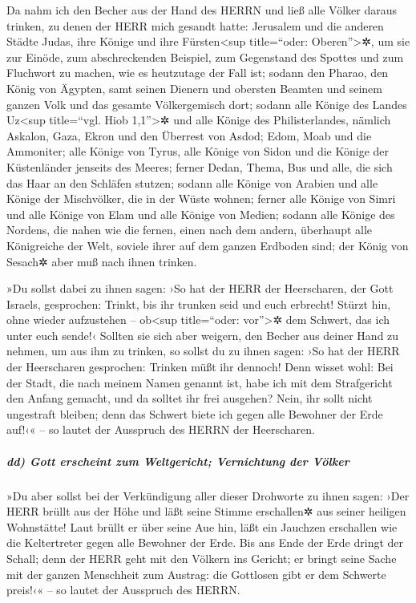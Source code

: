 Da nahm ich den Becher aus der Hand des HERRN und ließ
alle Völker daraus trinken, zu denen der HERR mich gesandt hatte:
Jerusalem und die anderen Städte Judas, ihre Könige und
ihre Fürsten\textless sup title=``oder: Oberen''\textgreater✲, um sie
zur Einöde, zum abschreckenden Beispiel, zum Gegenstand des Spottes und
zum Fluchwort zu machen, wie es heutzutage der Fall ist;
sodann den Pharao, den König von Ägypten, samt seinen
Dienern und obersten Beamten und seinem ganzen Volk und
das gesamte Völkergemisch dort; sodann alle Könige des Landes
Uz\textless sup title=``vgl. Hiob 1,1''\textgreater✲ und alle Könige des
Philisterlandes, nämlich Askalon, Gaza, Ekron und den Überrest von
Asdod; Edom, Moab und die Ammoniter; alle
Könige von Tyrus, alle Könige von Sidon und die Könige der Küstenländer
jenseits des Meeres; ferner Dedan, Thema, Bus und alle,
die sich das Haar an den Schläfen stutzen; sodann alle
Könige von Arabien und alle Könige der Mischvölker, die in der Wüste
wohnen; ferner alle Könige von Simri und alle Könige von
Elam und alle Könige von Medien; sodann alle Könige des
Nordens, die nahen wie die fernen, einen nach dem andern, überhaupt alle
Königreiche der Welt, soviele ihrer auf dem ganzen Erdboden sind; der
König von Sesach✲ aber muß nach ihnen trinken.

»Du sollst dabei zu ihnen sagen: ›So hat der HERR der
Heerscharen, der Gott Israels, gesprochen: Trinkt, bis ihr trunken seid
und euch erbrecht! Stürzt hin, ohne wieder aufzustehen --
ob\textless sup title=``oder: vor''\textgreater✲ dem Schwert, das ich
unter euch sende!‹ Sollten sie sich aber weigern, den
Becher aus deiner Hand zu nehmen, um aus ihm zu trinken, so sollst du zu
ihnen sagen: ›So hat der HERR der Heerscharen gesprochen: Trinken müßt
ihr dennoch! Denn wisset wohl: Bei der Stadt, die nach
meinem Namen genannt ist, habe ich mit dem Strafgericht den Anfang
gemacht, und da solltet ihr frei ausgehen? Nein, ihr sollt nicht
ungestraft bleiben; denn das Schwert biete ich gegen alle Bewohner der
Erde auf!‹« -- so lautet der Ausspruch des HERRN der Heerscharen.

\hypertarget{dd-gott-erscheint-zum-weltgericht-vernichtung-der-vuxf6lker}{%
\subparagraph{dd) Gott erscheint zum Weltgericht; Vernichtung der
Völker}\label{dd-gott-erscheint-zum-weltgericht-vernichtung-der-vuxf6lker}}

»Du aber sollst bei der Verkündigung aller dieser
Drohworte zu ihnen sagen: ›Der HERR brüllt aus der Höhe und läßt seine
Stimme erschallen✲ aus seiner heiligen Wohnstätte! Laut brüllt er über
seine Aue hin, läßt ein Jauchzen erschallen wie die Keltertreter gegen
alle Bewohner der Erde. Bis ans Ende der Erde dringt der
Schall; denn der HERR geht mit den Völkern ins Gericht; er bringt seine
Sache mit der ganzen Menschheit zum Austrag: die Gottlosen gibt er dem
Schwerte preis!‹« -- so lautet der Ausspruch des HERRN.

